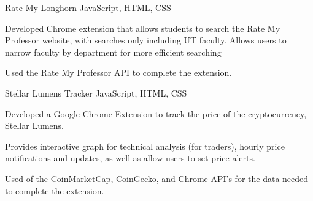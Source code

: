 \begin{cventries}
\cventry
    {Rate My Longhorn} %
    {JavaScript, HTML, CSS} %
    {
      \begin{cvitems} %
        \item {Developed Chrome extension that allows students to search the Rate My Professor website, with searches only including UT faculty. Allows users to narrow faculty by department for more efficient searching}
        \item {Used the Rate My Professor API to complete the extension.}
      \end{cvitems}
    }

\cventry
    {Stellar Lumens Tracker} %
    {JavaScript, HTML, CSS} %
    {
      \begin{cvitems} %
        \item {Developed a Google Chrome Extension to track the price of the cryptocurrency, Stellar Lumens.}
        \item {Provides interactive graph for technical analysis (for traders), hourly price notifications and updates, as well as allow users to set price alerts.}
        \item {Used of the CoinMarketCap, CoinGecko, and Chrome API's for the data needed to complete the extension.}
      \end{cvitems}
    }

\end{cventries}
